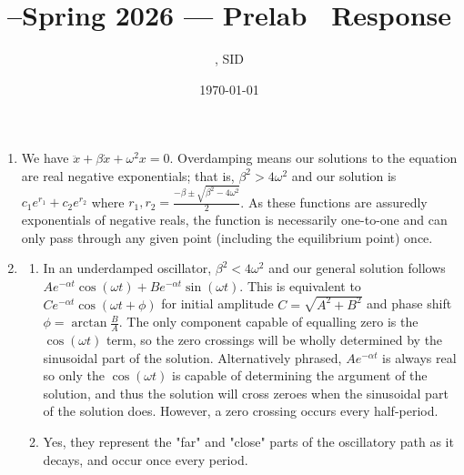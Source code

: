 \documentclass[11pt]{article}
\title{\Cls--Spring 2026 --- Prelab \Prelab \ Response}
\author{\Name, SID \SID}
\date{\today}
\newenvironment{qparts}{\begin{enumerate}[{(}a{)}]}{\end{enumerate}}
\begin{document}
\maketitle

\begin{enumerate}
    \item We have $\ddot{x} + \beta \dot{x} + \omega^2 x = 0$. Overdamping means our solutions to the equation are real negative exponentials; that is, $\beta^2 > 4\omega^2$ and our solution is $c_1 e^{r_1} + c_2 e^{r_2}$ where $r_1, r_2 = \frac{-\beta \pm \sqrt{\beta^2 - 4\omega^2}}{2}$. As these functions are assuredly exponentials of negative reals, the function is necessarily one-to-one and can only pass through any given point (including the equilibrium point) once.
    \item \begin{qparts}
              \item In an underdamped oscillator, $\beta^2 < 4\omega^2$ and our general solution follows $Ae^{-\alpha t} \cos(\omega t) + Be^{-\alpha t} \sin (\omega t)$. This is equivalent to $C e^{-\alpha t} \cos(\omega t + \phi)$ for initial amplitude $C = \sqrt{A^2 + B^2}$ and phase shift $\phi = \arctan{\frac{B}{A}}$. The only component capable of equalling zero is the $\cos(\omega t)$ term, so the zero crossings will be wholly determined by the sinusoidal part of the solution. Alternatively phrased, $Ae^{-\alpha t}$ is always real so only the $\cos(\omega t)$ is capable of determining the argument of the solution, and thus the solution will cross zeroes when the sinusoidal part of the solution does. However, a zero crossing occurs every half-period.
              \item Yes, they represent the "far" and "close" parts of the oscillatory path as it decays, and occur once every period.
          \end{qparts}
\end{enumerate}
\end{document}
